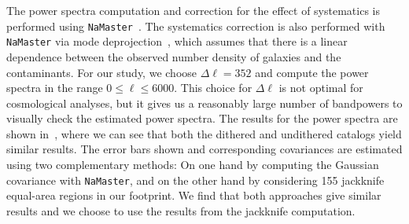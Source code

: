 \documentclass[\docopts]{\docclass}
\begin{document}
The power spectra computation and correction for the effect of systematics is performed using \texttt{NaMaster}~\citep{2019MNRAS.484.4127A}. The systematics correction is also performed with \texttt{NaMaster} via mode deprojection~\citep{2016MNRAS.456.2095E,2019MNRAS.484.4127A}, which assumes that there is a linear dependence between the observed number density of galaxies and the contaminants. For our study, we choose $\Delta \ell = 352$ and compute the power spectra in the range $0 \leq \ell \leq 6000$. This choice for $\Delta\ell$ is not optimal for cosmological analyses, but it gives us a reasonably large number of bandpowers to visually check the estimated power spectra. The results for the power spectra are shown in~, where we can see that both the dithered and undithered catalogs yield similar results. The error bars shown and corresponding covariances are estimated using two complementary methods: On one hand by computing the Gaussian covariance with \texttt{NaMaster}, and on the other hand by considering 155 jackknife equal-area regions in our footprint. We find that both approaches give similar results and we choose to use the results from the jackknife computation.
\end{document}
